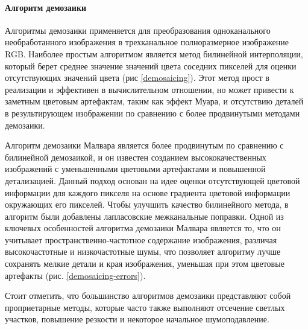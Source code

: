 \paragraph{Алгоритм демозаики}

Алгоритмы демозаики \cite{lib-demosaic} применяется для преобразования одноканального необработанного изображения в трехканальное полноразмерное изображение RGB. Наиболее простым алгоритмом является метод билинейной интерполяции, который берет среднее значение значений цвета соседних пикселей для оценки отсутствующих значений цвета (рис \ref{demosaicing}). Этот метод прост в реализации и эффективен в вычислительном отношении, но может привести к заметным цветовым артефактам, таким как эффект Муара, и отсутствию деталей в результирующем изображении по сравнению с более продвинутыми методами демозаики.


Алгоритм демозаики Малвара является более продвинутым по сравнению с билинейной демозаикой, и он известен созданием высококачественных изображений с уменьшенными цветовыми артефактами и повышенной детализацией. Данный подход основан на идее оценки отсутствующей цветовой информации для каждого пикселя на основе градиента цветовой информации окружающих его пикселей. Чтобы улучшить качество билинейного метода, в алгоритм были добавлены лапласовские межканальные поправки. Одной из ключевых особенностей алгоритма демозаики Малвара является то, что он учитывает пространственно-частотное содержание изображения, различая высокочастотные и низкочастотные шумы, что позволяет алгоритму лучше сохранять мелкие детали и края изображения, уменьшая при этом цветовые артефакты (рис. \ref{demosaicing-errors}).


Стоит отметить, что большинство алгоритмов демозаики представляют собой проприетарные методы, которые часто также выполняют отсечение светлых участков, повышение резкости и некоторое начальное шумоподавление. 
